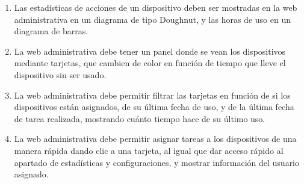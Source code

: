 \begin{enumerate}[label=NF\arabic* -]
    \item Las estadísticas de acciones de un dispositivo deben ser mostradas en la web administrativa en un diagrama de tipo Doughnut, y las horas de uso en un diagrama de barras.
    
    \item La web administrativa debe tener un panel donde se vean los dispositivos mediante tarjetas, que cambien de color en función de tiempo que lleve el dispositivo sin ser usado.
    
    \item La web administrativa debe permitir filtrar las tarjetas en función de si los dispositivos están asignados, de su última fecha de uso, y de la última fecha de tarea realizada, mostrando cuánto tiempo hace de su último uso.
    
    \item La web administrativa debe permitir asignar tareas a los dispositivos de una manera rápida dando clic a una tarjeta, al igual que dar acceso rápido al apartado de estadísticas y configuraciones, y mostrar información del usuario asignado.
    
\end{enumerate}
